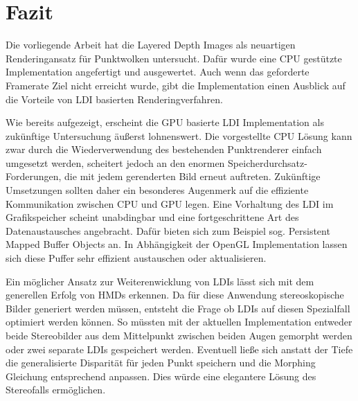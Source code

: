 \documentclass[hyperref, beleg, german, final, twoside]{cgvpub}
\begin{document}
\chapter{Fazit}

Die vorliegende Arbeit hat die Layered Depth Images als neuartigen
Renderingansatz für Punktwolken untersucht. Dafür wurde eine CPU gestützte
Implementation angefertigt und ausgewertet. Auch wenn das geforderte Framerate
Ziel nicht erreicht wurde, gibt die Implementation einen Ausblick auf die
Vorteile von LDI basierten Renderingverfahren.

Wie bereits aufgezeigt, erscheint die GPU basierte LDI Implementation als
zukünftige Untersuchung äußerst lohnenswert. Die vorgestellte CPU Lösung kann
zwar durch die Wiederverwendung des bestehenden Punktrenderer einfach umgesetzt
werden, scheitert jedoch an den enormen Speicherdurchsatz-Forderungen, die mit
jedem gerenderten Bild erneut auftreten. Zukünftige Umsetzungen sollten daher
ein besonderes Augenmerk auf die effiziente Kommunikation zwischen CPU und GPU
legen. Eine Vorhaltung des LDI im Grafikspeicher scheint unabdingbar und eine
fortgeschrittene Art des Datenaustausches angebracht. Dafür bieten sich zum
Beispiel sog. Persistent Mapped Buffer Objects an. In Abhängigkeit der OpenGL
Implementation lassen sich diese Puffer sehr effizient austauschen oder
aktualisieren.

Ein möglicher Ansatz zur Weiterenwicklung von LDIs lässt sich mit dem
generellen Erfolg von HMDs erkennen. Da für diese Anwendung stereoskopische
Bilder generiert werden müssen, entsteht die Frage ob LDIs auf diesen
Spezialfall optimiert werden können. So müssten mit der aktuellen
Implementation entweder beide Stereobilder aus dem Mittelpunkt zwischen beiden
Augen gemorpht werden oder zwei separate LDIs gespeichert werden. Eventuell
ließe sich anstatt der Tiefe die generalisierte Disparität für jeden Punkt
speichern und die Morphing Gleichung entsprechend anpassen. Dies würde eine
elegantere Lösung des Stereofalls ermöglichen.
\end{document}
